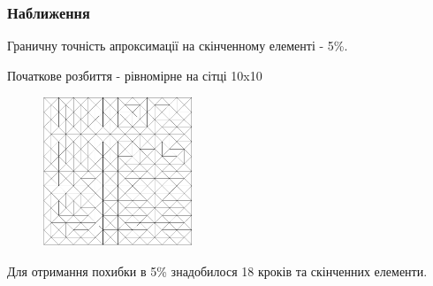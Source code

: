 \begin{frame}[allowframebreaks]
	\frametitle<presentation>{Наближення}

	Граничну точність апроксимації на скінченному елементі - 5\%.

	Початкове розбиття - рівномірне на сітці 10x10
	\begin{figure}[H]
		\centering
	    \includegraphics[width=0.4\textwidth]{problem1/InitialMesh}
	    \label{fig:init_mesh1}
	\end{figure}

	\framebreak

	Для отримання похибки в 5\% знадобилося 18 кроків та  скінченних елементи.


\end{frame}
